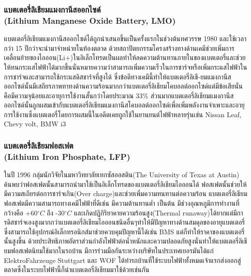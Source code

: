 \subsubsection*{แบตเตอรี่ลิเธียมแมงกานีสออกไซด์\\ (Lithium Manganese Oxide Battery, LMO)}
	แบตเตอรี่ลิเธียมแมงกานีสออกไซด์ได้ถูกนำเสนอขึ้นเป็นครั้งแรกในช่วงต้นทศวรรษ 1980 และใช้เวลากว่า 15 ปีกว่าจะนำมาจำหน่ายในท้องตลาด ด้วยสถาปัตยกรรมโครงสร้างทางด้านเคมีช่วยเพิ่มการเคลื่อนย้ายของไอออน(Li+)ในอิเล็กโทรดเป็นผลทำให้ลดความต้านทานภายในของแบตเตอรี่และช่วยให้ทนกระแสไฟฟ้าได้มากขึ้นนั่นหมายความว่าสามารถเพิ่มความเร็วในการชาร์จหรือเพิ่มกระแสไฟฟ้าในการชาร์จและสามารถใช้กระแสดิสชาร์จที่สูงได้ ซึ่งข้อดีทางเคมีนี้ทำให้แบตเตอรี่ลิเธี-ยมแมงกานีสออกไซด์นั้นมีเสถียรภาพทาทงด้านความร้อนมากกว่าแบตเตอรี่ลิเธียมโคบอลต์ออกไซด์แต่มีข้อเสียนั่นคือมีความจุน้อยและอายุการใช้งานสั้นกว่าโดยประมาณ 33\% 
\newline\hspace*{2cm}ส่วนมากแบตเตอรี่ลิเธียมแมงกานีสออกไซด์นั้นถูกผสมเข้ากับแบตเตอรี่ลิเธียมแมงกานีสโคบอลต์ออกไซด์เพื่อเพิ่มพลังงานจำเพาะและอายุการใช้งานซึ่งแบตเตอรี่โดยการผสมนี้ในอดีตเคยถูกใช้ในยานยนต์ไฟฟ้าหลายรุ่นเช่น Nissan Leaf, Chevy volt, BMW i3
\subsubsection*{แบตเตอรี่ลิเธียมฟอสเฟต\\ (Lithium Iron Phosphate, LFP)}
	ในปี 1996 กลุ่มนักวิจัยในมหาวิทยาลัยเทกซัสออสติน(The University of Texas at Austin) ค้นพบว่าฟอสเฟตนั้นสามารถนำมาใช้เป็นอิเล็กโทรดของแบตเตอรี่ลิเธียมไอออนได้ ฟอสเฟตนั้นช่วยให้มีความสเถียรต่อการชาร์จเกิน(Over charge)และช่วยเพิ่มความทนทานต่อความร้อน แบตเตอรี่ลิเธียมฟอสเฟตมีความสามารถทางเคมีไฟฟ้าที่ดีเช่น มีความต้านทานต่ำ เป็นต้น มีช่วงอุณหภูมิการทำงานที่กว้างคือ +60$^{\circ}C$ ถึง -30$^{\circ}C$ และเกิดปฏิกิริยาคายความร้อนสูง(Thermal runaway)ได้ยากแต่มีการดิสชาร์จเองสูงมากกว่าแบตเตอรี่ลิเธียมไอออนชนิดอื่นๆทำให้มีปัญหาทางด้านสมดุลของอายุแบตเตอรี่ซึ่งสามารถใช้อุปกรณ์อิเล็กทรอนิกส์มาช่วยควบคุมปัญหานี้ได้เช่น BMS แต่ก็ทำให้ราคาของแบตเตอรี่นั้นสูงขึ้น
\newline\hspace*{2cm}
ด้วยประสิทธิภาพอัตราส่วนกำลังไฟฟ้าต่อน้ำหนักและความปลอดภัยสูงนั่นทำให้แบตเตอรี่ลิเธียมฟอสเฟตนิยมใช้มากในรถบ้าน มีการร่วมมือกันระหว่างบริษัทในประเทศเยอรมันได้แก่ ElektroFahrzeuge Stuttgart และ WOF ได้ทำรถบ้านที่ใช้ระบบไฟฟ้าทั้งหมดเจ้าแรกส่งออกสู่ตลาดซึ่งในระบบไฟฟ้านี้ก็นำแบตเตอรี่ลิเธียมมาใช้ด้วยเช่นกัน
